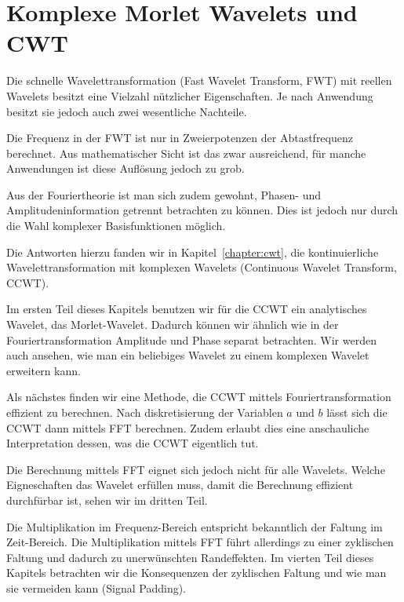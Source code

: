 %
%
%
\chapter{Komplexe Morlet Wavelets und CWT\label{chapter:thema}}
\begin{refsection}

Die schnelle Wavelettransformation (Fast Wavelet Transform, FWT) mit reellen Wavelets besitzt eine Vielzahl nützlicher Eigenschaften.
Je nach Anwendung besitzt sie jedoch auch zwei wesentliche Nachteile.

Die Frequenz in der FWT ist nur in Zweierpotenzen der Abtastfrequenz berechnet.
Aus mathematischer Sicht ist das zwar ausreichend, für manche Anwendungen ist diese Auflösung jedoch zu grob.

Aus der Fouriertheorie ist man sich zudem gewohnt, Phasen- und Amplitudeninformation getrennt betrachten zu können.
Dies ist jedoch nur durch die Wahl komplexer Basisfunktionen möglich.

Die Antworten hierzu fanden wir in Kapitel~\ref{chapter:cwt}, die kontinuierliche Wavelettransformation mit komplexen Wavelets (Continuous Wavelet Transform, CCWT).

Im ersten Teil dieses Kapitels benutzen wir für die CCWT ein analytisches Wavelet, das Morlet-Wavelet.
Dadurch können wir ähnlich wie in der Fouriertransformation Amplitude und Phase separat betrachten.
Wir werden auch ansehen, wie man ein beliebiges Wavelet zu einem komplexen Wavelet erweitern kann.

Als nächstes finden wir eine Methode, die CCWT mittels Fouriertransformation effizient zu berechnen.
Nach diskretisierung der Variablen $a$ und $b$ lässt sich die CCWT dann mittels FFT berechnen.
Zudem erlaubt dies eine anschauliche Interpretation dessen, was die CCWT eigentlich tut.

Die Berechnung mittels FFT eignet sich jedoch nicht für alle Wavelets.
Welche Eigneschaften das Wavelet erfüllen muss, damit die Berechnung effizient durchfürbar ist, sehen wir im dritten Teil.

Die Multiplikation im Frequenz-Bereich entspricht bekanntlich der Faltung im Zeit-Bereich.
Die Multiplikation mittels FFT führt allerdings zu einer zyklischen Faltung und dadurch zu unerwünschten Randeffekten.
Im vierten Teil dieses Kapitels betrachten wir die Konsequenzen der zyklischen Faltung und wie man sie vermeiden kann (Signal Padding).


\end{refsection}

